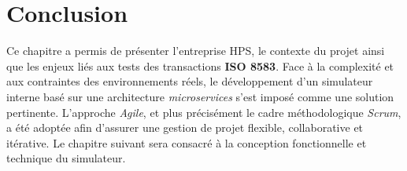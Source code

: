 






\section*{Conclusion }
Ce chapitre a permis de présenter l’entreprise HPS, le contexte du projet ainsi que les enjeux liés aux tests des transactions \textbf{ISO 8583}. Face à la complexité et aux contraintes des environnements réels, le développement d’un simulateur interne basé sur une architecture \textit{microservices} s’est imposé comme une solution pertinente. L’approche \textit{Agile}, et plus précisément le cadre méthodologique \textit{Scrum}, a été adoptée afin d’assurer une gestion de projet flexible, collaborative et itérative. Le chapitre suivant sera consacré à la conception fonctionnelle et technique du simulateur.


